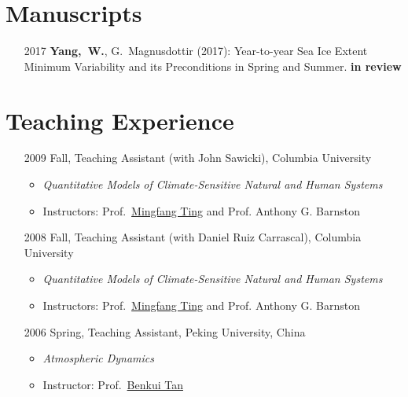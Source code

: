 \documentclass[11pt]{article}
\newcommand{\benkui}{\href{http://www.phy.pku.edu.cn/personnel/das/bktan.xml}{Benkui Tan}}
\newcommand{\mingfang}{\href{http://www.ldeo.columbia.edu/user/ting}{Mingfang Ting}}
\begin{document}
\section{Manuscripts}
\begin{itemize}[leftmargin=10ex, itemsep=1ex]
	\item[2017] \textbf{Yang,~W.}, G.~Magnusdottir (2017): Year-to-year Sea Ice Extent Minimum Variability and its Preconditions in Spring and Summer. \textbf{in review}

\end{itemize}


\section{Teaching Experience}
\begin{itemize}[leftmargin=10ex, itemsep=1ex]
	\item[2009] Fall, Teaching  Assistant (with John Sawicki), Columbia University
	\begin{itemize}[leftmargin=0ex]
		\item \textit{Quantitative Models of Climate-Sensitive Natural and Human Systems}
		\item Instructors: Prof.~\mingfang{} and Prof. Anthony G. Barnston
		\end{itemize}

	\item[2008] Fall, Teaching  Assistant (with Daniel Ruiz Carrascal),  Columbia University
	\begin{itemize}[leftmargin=0ex]
		\item \textit{Quantitative Models of Climate-Sensitive Natural and Human Systems}
		\item Instructors: Prof.~\mingfang{} and Prof. Anthony G. Barnston
		\end{itemize}

	\item[2006] Spring, Teaching  Assistant, Peking University, China
	\begin{itemize}[leftmargin=0ex]
		\item \textit{Atmospheric Dynamics}
		\item Instructor: Prof.~\benkui{}
		\end{itemize}
	\end{itemize}
\end{document}
